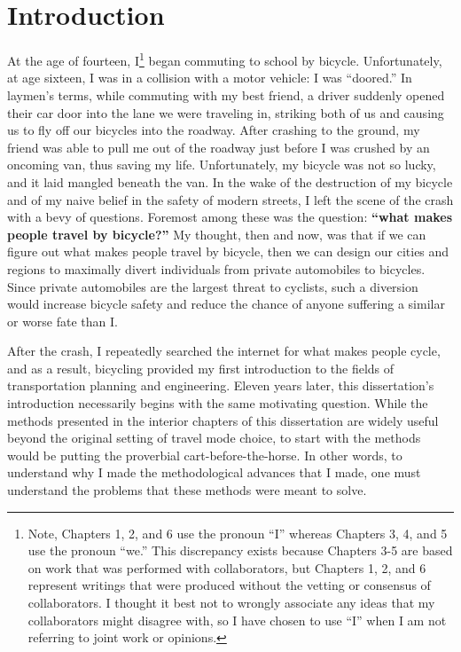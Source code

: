 
\chapter{Introduction}
\label{ch:1}
At the age of fourteen, I\footnote{Note, Chapters 1, 2, and 6 use the pronoun ``I'' whereas Chapters 3, 4, and 5 use the pronoun ``we.'' This discrepancy exists because Chapters 3-5 are based on work that was performed with collaborators, but Chapters 1, 2, and 6 represent writings that were produced without the vetting or consensus of collaborators. I thought it best not to wrongly associate any ideas that my collaborators might disagree with, so I have chosen to use ``I'' when I am not referring to joint work or opinions.} began commuting to school by bicycle. Unfortunately, at age sixteen, I was in a collision with a motor vehicle: I was ``doored.'' In laymen's terms, while commuting with my best friend, a driver suddenly opened their car door into the lane we were traveling in, striking both of us and causing us to fly off our bicycles into the roadway. After crashing to the ground, my friend was able to pull me out of the roadway just before I was crushed by an oncoming van, thus saving my life. Unfortunately, my bicycle was not so lucky, and it laid mangled beneath the van. In the wake of the destruction of my bicycle and of my naive belief in the safety of modern streets, I left the scene of the crash with a bevy of questions. Foremost among these was the question: \textbf{``what makes people travel by bicycle?''} My thought, then and now, was that if we can figure out what makes people travel by bicycle, then we can design our cities and regions to maximally divert individuals from private automobiles to bicycles. Since private automobiles are the largest threat to cyclists, such a diversion would increase bicycle safety and reduce the chance of anyone suffering a similar or worse fate than I.

After the crash, I repeatedly searched the internet for what makes people cycle, and as a result, bicycling provided my first introduction to the fields of transportation planning and engineering. Eleven years later, this dissertation's introduction necessarily begins with the same motivating question. While the methods presented in the interior chapters of this dissertation are widely useful beyond the original setting of travel mode choice, to start with the methods would be putting the proverbial cart-before-the-horse. In other words, to understand why I made the methodological advances that I made, one must understand the problems that these methods were meant to solve.

